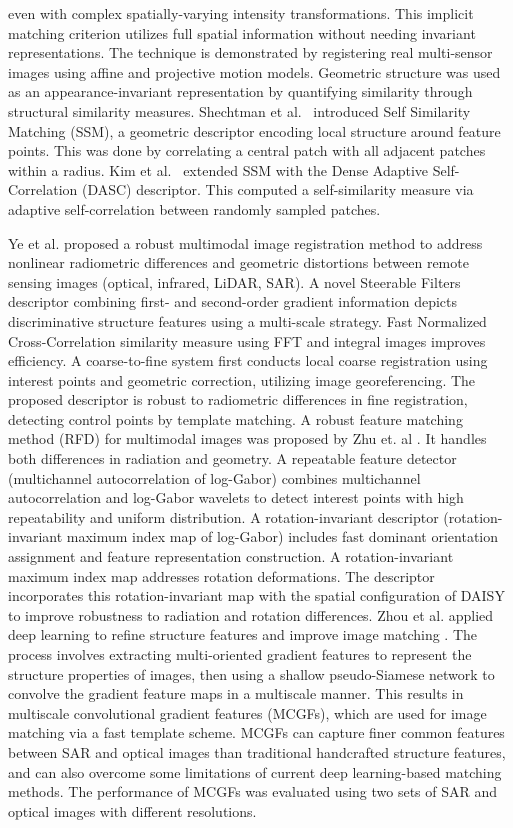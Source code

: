 \documentclass[10pt,journal]{IEEEtran}\usepackage{amsfonts}
\begin{document}
even with complex spatially-varying intensity transformations. This implicit
matching criterion utilizes full spatial information without needing
invariant representations. The technique is demonstrated by registering real
multi-sensor images using affine and projective motion models. Geometric
structure was used as an appearance-invariant representation by quantifying
similarity through structural similarity measures. Shechtman et al.~\cite {shechtman2007matching} introduced Self Similarity Matching (SSM), a
geometric descriptor encoding local structure around feature points. This
was done by correlating a central patch with all adjacent patches within a
radius. Kim et al.~\cite{kim2015dasc} extended SSM with the Dense Adaptive
Self-Correlation (DASC) descriptor. This computed a self-similarity measure
via adaptive self-correlation between randomly sampled patches.

Ye et al. proposed a robust multimodal image registration method \cite {YE2022331} to address nonlinear radiometric differences and geometric
distortions between remote sensing images (optical, infrared, LiDAR, SAR). A
novel Steerable Filters descriptor combining first- and second-order
gradient information depicts discriminative structure features using a
multi-scale strategy. Fast Normalized Cross-Correlation similarity measure
using FFT and integral images improves efficiency. A coarse-to-fine system
first conducts local coarse registration using interest points and geometric
correction, utilizing image georeferencing. The proposed descriptor is
robust to radiometric differences in fine registration, detecting control
points by template matching. A robust feature matching method (RFD) for multimodal images was proposed by Zhu et. al \cite{10092838}. It
handles both differences in radiation and geometry. A repeatable feature
detector (multichannel autocorrelation of log-Gabor) combines multichannel
autocorrelation and log-Gabor wavelets to detect interest points with high
repeatability and uniform distribution. A rotation-invariant descriptor
(rotation-invariant maximum index map of log-Gabor) includes fast dominant
orientation assignment and feature representation construction. A
rotation-invariant maximum index map addresses rotation deformations. The
descriptor incorporates this rotation-invariant map with the spatial
configuration of DAISY to improve robustness to radiation and rotation
differences. Zhou et al. applied deep learning to refine structure features
and improve image matching \cite{9541389}. The process involves extracting
multi-oriented gradient features to represent the structure properties of
images, then using a shallow pseudo-Siamese network to convolve the gradient
feature maps in a multiscale manner. This results in multiscale
convolutional gradient features (MCGFs), which are used for image matching
via a fast template scheme. MCGFs can capture finer common features between
SAR and optical images than traditional handcrafted structure features, and
can also overcome some limitations of current deep learning-based matching
methods. The performance of MCGFs was evaluated using two sets of SAR and
optical images with different resolutions.
\end{document}
